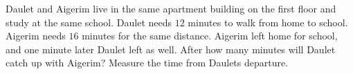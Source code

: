 Daulet and Aigerim live in the same apartment building on the first floor and study at the same school. Daulet needs $12$ minutes to walk from home to school. Aigerim needs $16$ minutes for the same distance. Aigerim left home for school, and one minute later Daulet left as well. After how many minutes will Daulet catch up with Aigerim?  Measure the time from Daulet\textquotesingle s departure.
